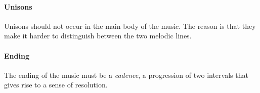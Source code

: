 \paragraph{Unisons}
Unisons should not occur in the main body of the music.
The reason is that they make it harder to distinguish between
the two melodic lines.

\paragraph{Ending}
The ending of the music must be a \emph{cadence}, a progression
of two intervals that gives rise to a sense of resolution.
